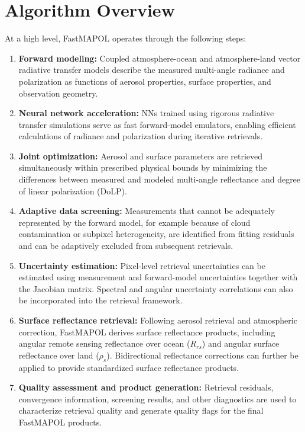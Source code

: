 \documentclass[
  11pt,
  letterpaper,
]{scrreprt}
\begin{document}
\section{Algorithm Overview}\label{algorithm-overview}

At a high level, FastMAPOL operates through the following steps:

\begin{enumerate}
\def\labelenumi{\arabic{enumi}.}
\item
  \textbf{Forward modeling:} Coupled atmosphere-ocean and
  atmosphere-land vector radiative transfer models describe the measured
  multi-angle radiance and polarization as functions of aerosol
  properties, surface properties, and observation geometry.
\item
  \textbf{Neural network acceleration:} NNs trained using rigorous
  radiative transfer simulations serve as fast forward-model emulators,
  enabling efficient calculations of radiance and polarization during
  iterative retrievals.
\item
  \textbf{Joint optimization:} Aerosol and surface parameters are
  retrieved simultaneously within prescribed physical bounds by
  minimizing the differences between measured and modeled multi-angle
  reflectance and degree of linear polarization (DoLP).
\item
  \textbf{Adaptive data screening:} Measurements that cannot be
  adequately represented by the forward model, for example because of
  cloud contamination or subpixel heterogeneity, are identified from
  fitting residuals and can be adaptively excluded from subsequent
  retrievals.
\item
  \textbf{Uncertainty estimation:} Pixel-level retrieval uncertainties
  can be estimated using measurement and forward-model uncertainties
  together with the Jacobian matrix. Spectral and angular uncertainty
  correlations can also be incorporated into the retrieval framework.
\item
  \textbf{Surface reflectance retrieval:} Following aerosol retrieval
  and atmospheric correction, FastMAPOL derives surface reflectance
  products, including angular remote sensing reflectance over ocean
  (\(R_{rs}\)) and angular surface reflectance over land (\(\rho_s\)).
  Bidirectional reflectance corrections can further be applied to
  provide standardized surface reflectance products.
\item
  \textbf{Quality assessment and product generation:} Retrieval
  residuals, convergence information, screening results, and other
  diagnostics are used to characterize retrieval quality and generate
  quality flags for the final FastMAPOL products.
\end{enumerate}
\end{document}

